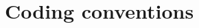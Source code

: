 \chapter{Coding conventions}
\hypertarget{md_coding__guidelines}{}\label{md_coding__guidelines}
\label{md_coding__guidelines_autotoc_md34}%
%
